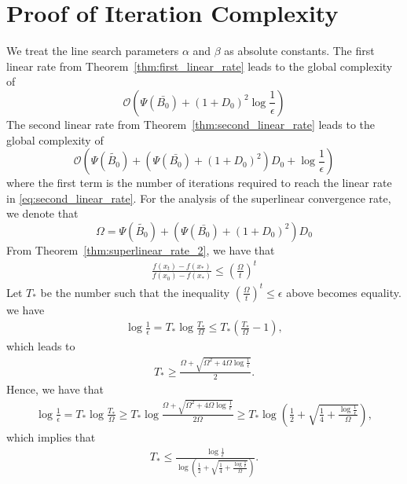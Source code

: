 \documentclass[11pt,letterpaper]{article}
\newcommand\0{{\Vector{0}}}
\newcommand\1{{\Vector{1}}}
\numberwithin{assumption}{section}
\numberwithin{definition}{section}
\numberwithin{theorem}{section}
\numberwithin{remark}{section}
\begin{document}
\section{Proof of Iteration Complexity}\label{proof_of_complexity}

We treat the line search parameters $\alpha$ and $\beta$ as absolute constants. The first linear rate from Theorem~\ref{thm:first_linear_rate} leads to the global complexity of 
\begin{equation}\label{complexity_1}
    \mathcal{O}( \Psi(\bar{B_0}) + (1 + D_0)^2 \log{\frac{1}{\epsilon}} )
\end{equation}
The second linear rate from Theorem~\ref{thm:second_linear_rate} leads to the global complexity of 
\begin{equation}\label{complexity_2}
    \mathcal{O}( \Psi(\tilde{B_0}) + (\Psi(\bar{B_0}) + (1 + D_0)^2)D_0 + \log{\frac{1}{\epsilon}} )
\end{equation}
where the first term is the number of iterations required to reach the linear rate in \eqref{eq:second_linear_rate}. For the analysis of the superlinear convergence rate, we denote that 
\begin{equation*}
    \Omega = \Psi(\tilde{B_0}) + (\Psi(\bar{B_0}) + (1 + D_0)^2)D_0
\end{equation*}
From Theorem~\ref{thm:superlinear_rate_2}, we have that
\begin{align*}
    \frac{f(x_t) - f(x_*)}{f(x_0) - f(x_*)} \leq (\frac{\Omega}{t})^{t}
\end{align*}
Let $T_*$ be the number such that the inequality $(\frac{\Omega}{t})^{t} \leq \epsilon$ above becomes equality. we have
\begin{align*}
    \log{\frac{1}{\epsilon}} = T_* \log{\frac{T_*}{\Omega}} \leq T_*(\frac{T_*}{\Omega} - 1),
\end{align*}
which leads to
\begin{align*}
    T_* \geq \frac{\Omega + \sqrt{\Omega^2 + 4\Omega\log{\frac{1}{\epsilon}}}}{2}.
\end{align*}
Hence, we have that
\begin{align*}
    \log{\frac{1}{\epsilon}} = T_* \log{\frac{T_*}{\Omega}} \geq T_*\log{\frac{\Omega + \sqrt{\Omega^2 + 4\Omega\log{\frac{1}{\epsilon}}}}{2\Omega}} \geq T_*\log{\left(\frac{1}{2} + \sqrt{\frac{1}{4} + \frac{\log{\frac{1}{\epsilon}}}{\Omega}}\right)},
\end{align*}
which implies that
\begin{align*}
    T_* \leq \frac{\log{\frac{1}{\epsilon}}}{\log{\left(\frac{1}{2} + \sqrt{\frac{1}{4} + \frac{\log{\frac{1}{\epsilon}}}{\Omega}}\right)}}.
\end{align*}
\end{document}
